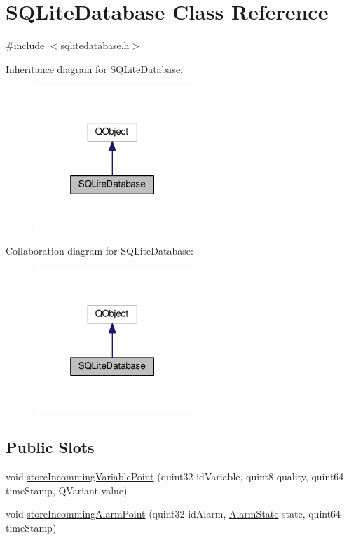 \hypertarget{class_s_q_lite_database}{}\section{S\+Q\+Lite\+Database Class Reference}
\label{class_s_q_lite_database}


{\ttfamily \#include $<$sqlitedatabase.\+h$>$}



Inheritance diagram for S\+Q\+Lite\+Database\+:
\nopagebreak
\begin{figure}[H]
\begin{center}
\leavevmode
\includegraphics[width=169pt]{class_s_q_lite_database__inherit__graph}
\end{center}
\end{figure}


Collaboration diagram for S\+Q\+Lite\+Database\+:
\nopagebreak
\begin{figure}[H]
\begin{center}
\leavevmode
\includegraphics[width=169pt]{class_s_q_lite_database__coll__graph}
\end{center}
\end{figure}
\subsection*{Public Slots}
\begin{DoxyCompactItemize}
\item 
void \hyperlink{class_s_q_lite_database_aa7e62f22fdee933bbab0646b8b771465}{store\+Incomming\+Variable\+Point} (quint32 id\+Variable, quint8 quality, quint64 time\+Stamp, Q\+Variant value)
\item 
void \hyperlink{class_s_q_lite_database_afd060254d658b18af8a7157e5a3c444e}{store\+Incomming\+Alarm\+Point} (quint32 id\+Alarm, \hyperlink{alarm__states__enum_8h_a493dfe4e2144bc496098813185ca09bf}{Alarm\+State} state, quint64 time\+Stamp)
\end{DoxyCompactItemize}
